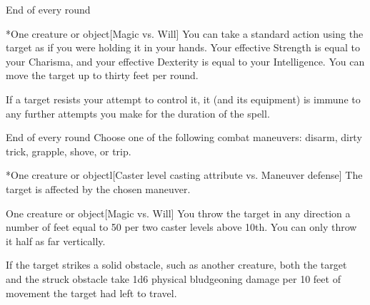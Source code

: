 \begin{spellheader}
    \spellrng{\rngmed}
\end{spellheader}
\begin{spelleffects}
    \begin{spelltrigger}{End of every round}
        \begin{spelltarget}*{One creature or object}[Magic vs. Will]
            \spellsuccess You can take a standard action using the target as if you were holding it in your hands. Your effective Strength is equal to your Charisma, and your effective Dexterity is equal to your Intelligence. You can move the target up to thirty feet per round.
        \end{spelltarget}
    \end{spelltrigger}
\end{spelleffects}
\begin{spellfooter}
    \spellnotes If a target resists your attempt to control it, it (and its equipment) is immune to any further attempts you make for the duration of the spell.
\end{spellfooter}

\begin{spellheader}
    \spellrng{\rngmed}
\end{spellheader}
\begin{spelleffects}
    \spellline
    \begin{spelltrigger}{End of every round}
        \spellspecial Choose one of the following combat maneuvers: disarm, dirty trick, grapple, shove, or trip.
        \begin{spelltarget}*{One creature or object}l[Caster level \add casting attribute vs. Maneuver defense]
            \spellsuccess The target is affected by the chosen maneuver.
        \end{spelltarget}
    \end{spelltrigger}
\end{spelleffects}

\begin{spellheader}
\end{spellheader}
\begin{spelleffects}
    \begin{spelltarget}{One creature or object}[Magic vs. Will]
        \spellsuccess You throw the target in any direction a number of feet equal to 50  per two caster levels above 10th. You can only throw it half as far vertically.

        If the target strikes a solid obstacle, such as another creature, both the target and the struck obstacle take 1d6 physical bludgeoning damage per 10 feet of movement the target had left to travel.
    \end{spelltarget}
\end{spelleffects}

